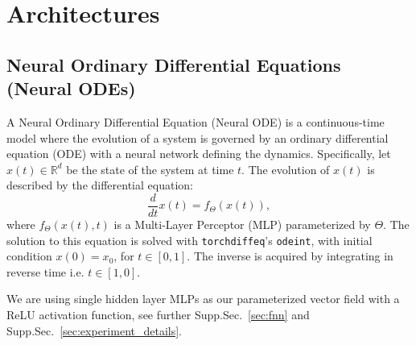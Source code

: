 \documentclass{article}
\theoremstyle{definition} \newtheorem{definition}{Definition}  \newtheorem{example}{Example}
\theoremstyle{remark} \newtheorem{remark}{Remark}
\newcounter{ct}
\begin{document}
\newpage
\section{Architectures}\label{sec:architectures}
\subsection{Neural Ordinary Differential Equations (Neural ODEs)}\label{sec:node}
\citep{chen2018neural,massaroli2020dissecting}
A Neural Ordinary Differential Equation (Neural ODE) is a continuous-time model where the evolution of a system is governed by an ordinary differential equation (ODE) with a neural network defining the dynamics.
Specifically, let \( x(t) \in \mathbb{R}^d \) be the state of the system at time \( t \). 
The evolution of \( x(t) \) is described by the differential equation:
\begin{equation}
    \frac{d}{dt} x(t) = f_\Theta(x(t)),
\end{equation}
where \( f_\Theta(x(t), t) \) is a Multi-Layer Perceptor (MLP) parameterized by \( \Theta \).
The solution to this equation is solved with \texttt{torchdiffeq}'s \texttt{odeint}, with initial condition \( x(0) = x_0 \), for $t\in[0,1]$\citep{torchdiffeq}.
The inverse is acquired by integrating in reverse time i.e. $t\in[1,0]$.

We are using single hidden layer MLPs as our parameterized vector field with a ReLU activation function, see further Supp.Sec.~\ref{sec:fnn} and Supp.Sec.~\ref{sec:experiment_details}.


\end{document}
